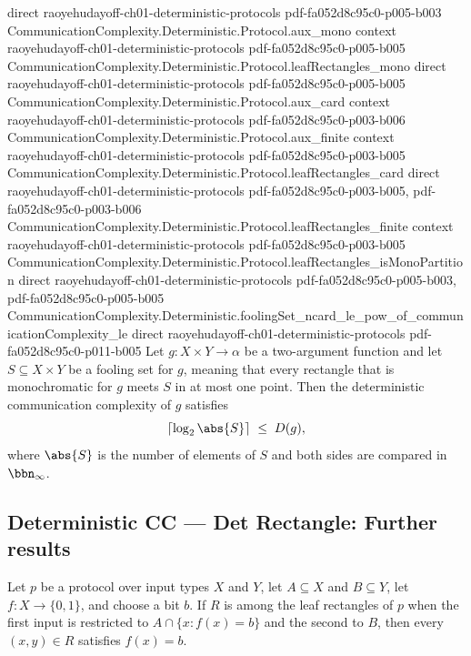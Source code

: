 \begin{theorem}
  {direct}
  {raoyehudayoff-ch01-deterministic-protocols}
  {pdf-fa052d8c95c0-p005-b003}
\proofstep
  {CommunicationComplexity.Deterministic.Protocol.aux_mono}
  {context}
  {raoyehudayoff-ch01-deterministic-protocols}
  {pdf-fa052d8c95c0-p005-b005}
\proofstep
  {CommunicationComplexity.Deterministic.Protocol.leafRectangles_mono}
  {direct}
  {raoyehudayoff-ch01-deterministic-protocols}
  {pdf-fa052d8c95c0-p005-b005}
\proofstep
  {CommunicationComplexity.Deterministic.Protocol.aux_card}
  {context}
  {raoyehudayoff-ch01-deterministic-protocols}
  {pdf-fa052d8c95c0-p003-b006}
\proofstep
  {CommunicationComplexity.Deterministic.Protocol.aux_finite}
  {context}
  {raoyehudayoff-ch01-deterministic-protocols}
  {pdf-fa052d8c95c0-p003-b005}
\proofstep
  {CommunicationComplexity.Deterministic.Protocol.leafRectangles_card}
  {direct}
  {raoyehudayoff-ch01-deterministic-protocols}
  {pdf-fa052d8c95c0-p003-b005,
    pdf-fa052d8c95c0-p003-b006}
\proofstep
  {CommunicationComplexity.Deterministic.Protocol.leafRectangles_finite}
  {context}
  {raoyehudayoff-ch01-deterministic-protocols}
  {pdf-fa052d8c95c0-p003-b005}
\proofstep
  {CommunicationComplexity.Deterministic.Protocol.leafRectangles_isMonoPartition}
  {direct}
  {raoyehudayoff-ch01-deterministic-protocols}
  {pdf-fa052d8c95c0-p005-b003,
    pdf-fa052d8c95c0-p005-b005}
\proofstep
  {CommunicationComplexity.Deterministic.foolingSet_ncard_le_pow_of_communicationComplexity_le}
  {direct}
  {raoyehudayoff-ch01-deterministic-protocols}
  {pdf-fa052d8c95c0-p011-b005}
Let $g : X \times Y \to \alpha$ be a two-argument function and let $S \subseteq X \times
Y$ be a fooling set for $g$, meaning that every rectangle that is monochromatic for $g$
meets $S$ in at most one point. Then the deterministic communication complexity of $g$
satisfies
\[
  \lceil \log_2 \abs{S} \rceil \;\le\; D(g),
\]
where $\abs{S}$ is the number of elements of $S$ and both sides are compared in
$\bbn_\infty$.
\end{theorem}

\subsection*{Deterministic CC --- Det Rectangle: Further results}

\begin{lemma}
\label{CommunicationComplexity.Deterministic.Protocol.aux_alice_bit}
\leanok
{}
Let $p$ be a protocol over input types $X$ and $Y$, let $A\subseteq X$ and $B\subseteq
Y$, let $f:X\to\{0,1\}$, and choose a bit $b$. If $R$ is among the leaf rectangles of
$p$ when the first input is restricted to $A\cap\{x:f(x)=b\}$ and the second to $B$,
then every $(x,y)\in R$ satisfies $f(x)=b$.
\end{lemma}

